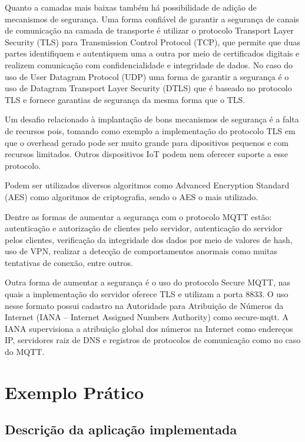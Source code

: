 \documentclass[12pt, a4paper]{article}
\begin{document}
    Quanto a camadas mais baixas também há possibilidade de adição de mecanismos de segurança.  Uma forma confiável de garantir a segurança de canais de comunicação na camada de transporte é utilizar o protocolo Transport Layer Security (TLS) para Transmission Control Protocol (TCP), que permite que duas partes identifiquem e autentiquem uma a outra por meio de certificados digitais e realizem comunicação com confidencialidade e integridade de dados. No caso do uso de User Datagram Protocol (UDP) uma forma de garantir a segurança é o uso de Datagram Transport Layer Security (DTLS) que é baseado no protocolo TLS e fornece garantias de segurança da mesma forma que o TLS.
    \cite{TLS, TLS2, DTLS}
    
    Um desafio relacionado à implantação de bons mecanismos de segurança é a falta de recursos pois, tomando como exemplo a implementação do protocolo TLS em que o overhead gerado pode ser muito grande para dipositivos pequenos e com recursos limitados. Outros dispositivos IoT podem nem oferecer suporte a esse protocolo.
    \cite{MQTT_Vunerabilities}
    
    Podem ser utilizados diversos algoritmos como Advanced Encryption Standard (AES) como algoritmos de criptografia, sendo o AES o mais utilizado. 
    \cite{MQTT_DOC}
    
    Dentre as formas de aumentar a segurança com o protocolo MQTT estão: autenticação e autorização de clientes pelo servidor, autenticação do servidor pelos clientes, verificação da integridade dos dados por meio de valores de hash, uso de VPN, realizar a detecção de comportamentos anormais como muitas tentativas de conexão, entre outros.
    \cite{MQTT_DOC}
    
    Outra forma de aumentar a segurança é o uso do protocolo Secure MQTT, nas quais a implementação do servidor oferece TLS e utilizam a porta 8833. O uso nesse formato possui cadastro na Autoridade para Atribuição de Números da Internet (IANA – Internet Assigned Numbers Authority) como secure-mqtt. A IANA supervisiona a atribuição global dos números na Internet como endereços IP, servidores raiz de DNS e registros de protocolos de comunicação como no caso do MQTT.
    \cite{MQTT_DOC, IANA}

\cleardoublepage

\section{Exemplo Prático}

\subsection{Descrição da aplicação implementada}
\end{document}
